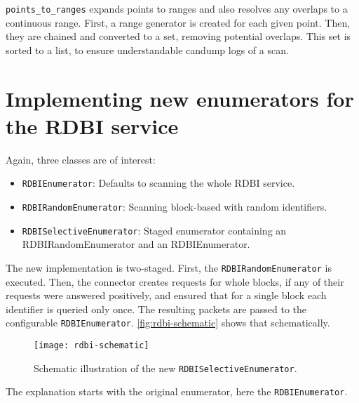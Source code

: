 \texttt{points_to_ranges} expands points to ranges and also resolves any overlaps to a continuous range.
First, a range generator is created for each given point. Then, they are chained and converted to a set, removing potential overlaps. This set is sorted to a list, to ensure understandable candump logs of a scan.

\section{Implementing new enumerators for the RDBI service}

Again, three classes are of interest:

\begin{itemize}
    \item \texttt{RDBIEnumerator}: Defaults to scanning the whole RDBI service.
    \item \texttt{RDBIRandomEnumerator}: Scanning block-based with random identifiers.
    \item \texttt{RDBISelectiveEnumerator}: Staged enumerator containing an RDBIRandomEnumerator and an RDBIEnumerator.
\end{itemize}

The new implementation is two-staged. First, the \texttt{RDBIRandomEnumerator} is executed. Then, the connector creates requests for whole blocks, if any of their requests were answered positively, and ensured that for a single block each identifier is queried only once. The resulting packets are passed to the configurable \texttt{RDBIEnumerator}. \autoref{fig:rdbi-schematic} shows that schematically.

\begin{figure}[htb]
    \centering
    \texttt{[image: rdbi-schematic]}
    \caption{Schematic illustration of the new \texttt{RDBISelectiveEnumerator}.}
    \label{fig:rdbi-schematic}
\end{figure}

The explanation starts with the original enumerator, here the \texttt{RDBIEnumerator}.


